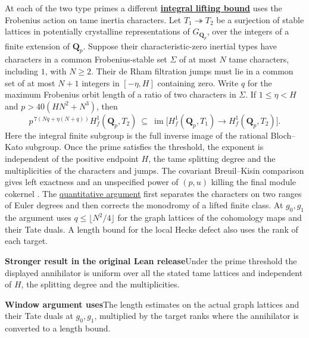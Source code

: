 \documentclass[11pt,a4paper]{article}
\newcommand{\rhscopelabel}[2]{%
  {\setlength{\fboxsep}{2pt}\colorbox{#1}{%
    \small\sffamily\bfseries\color{PageInk}#2}}}
\newcommand{\rhrange}[3][Stronger result in the original Lean release]{%
  \par\addvspace{.45\baselineskip}\Needspace{4\baselineskip}%
  \begingroup\setlength{\leftskip}{.65em}\setlength{\parindent}{0pt}%
  \noindent\rhscopelabel{TraceTint}{#1}\enspace#2\par
  \nobreak\smallskip
  \noindent\rhscopelabel{FieldTint}{Window argument uses}\enspace#3\par
  \endgroup\addvspace{.45\baselineskip}}
\begin{document}
At each of the two type primes a different
\textbf{\hyperlink{candidate.tame-type-lifting}{integral lifting bound}}
uses the Frobenius action on tame inertia characters. Let
\(T_1\twoheadrightarrow T_2\) be a surjection of stable lattices in
potentially crystalline representations of \(G_{\mathbf Q_p}\), over
the integers of a finite extension of \(\mathbf Q_p\). Suppose their
characteristic-zero inertial
types have characters in a common Frobenius-stable set \(\Sigma\)
of at most \(N\) tame characters, including \(1\), with \(N\ge2\).
Their de Rham filtration jumps must lie in a common set of at
most \(N+1\) integers in \([-\eta,H]\) containing zero.
Write \(q\) for the maximum Frobenius orbit length of a ratio
of two characters in \(\Sigma\). If \(1\le\eta<H\) and
\(p>40(HN^2+N^3)\), then
\[
 p^{\,7(Nq+\eta(N+q))}H^1_f(\mathbf Q_p,T_2)
 \ \subseteq\ \operatorname{im}
 \bigl[H^1_f(\mathbf Q_p,T_1)\longrightarrow H^1_f(\mathbf Q_p,T_2)\bigr].
\]
Here the integral finite subgroup is the full inverse image of the
rational Bloch--Kato subgroup. Once the prime satisfies the threshold,
the exponent is independent of the positive endpoint \(H\), the tame
splitting degree and the multiplicities of the characters and jumps.
The covariant Breuil--Kisin comparison gives left exactness and an
unspecified power of \((p,u)\) killing the final module cokernel
\cite[Proposition~3.4]{cgm-integral}. The
\hyperlink{proof.tame-type-lifting}{quantitative argument} first
separates the characters on two ranges of Euler degrees and then
corrects the monodromy of a lifted finite class. At \(g_0,g_1\) the
argument uses \(q\le\lfloor N^2/4\rfloor\) for the graph lattices
of the cohomology maps and their Tate duals. A length bound for
the local Hecke defect also uses the rank of each target.
\rhrange{Under the prime threshold the displayed annihilator is uniform
over all the stated tame lattices and independent of \(H\), the
splitting degree and the multiplicities.}
{The length estimates on the actual graph lattices and their Tate
duals at \(g_0,g_1\), multiplied by the target ranks where the
annihilator is converted to a length bound.}
\end{document}
